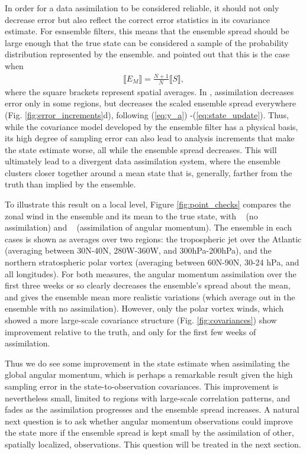 In order for a data assimilation to be considered reliable, it should not only 
decrease error but also reflect the correct error statistics in its covariance 
estimate. 
For esnsemble filters, this means that the ensemble spread should be large 
enough that the true state can be considered  a sample of the probability 
distribution represented by the ensemble.
 \citet{Huntley2009} and \citet{Murphy1988} pointed out that this is the case when 
 \begin{eqnarray}
	 \llbracket E_M \rrbracket = \frac{N+1}{N} \llbracket S \rrbracket, 
	 \label{eq:EvsS}
 \end{eqnarray}
where the square brackets represent spatial averages. 
In \ERPALL, assimilation decreases error only in some regions, but 
decreases the scaled ensemble spread everywhere (Fig. \ref{fig:error_increments}d), following (\ref{eq:y_a}) -(\ref{eq:state_update}).  
Thus, while the covariance model developed by the ensemble filter has a physical basis, its high degree of sampling error can also lead to analysis increments that make the state estimate worse, all while the ensemble spread decreases.  
This will ultimately lead to a divergent data assimilation system, where the ensemble clusters closer together around a mean state that is, generally, farther from the truth than implied by the ensemble. 


To illustrate this result on a local level, Figure \ref{fig:point_checks} compares the zonal wind in the ensemble and its mean to the true state, with \NODA~ (no assimilation) and \ERPALL~ (assimilation of angular momentum). 
The ensemble in each cases is shown as averages over two regions: the tropospheric jet over the Atlantic (averaging between 30N-40N, 280W-360W, and 300hPa-200hPa), and the northern stratospheric polar vortex (averaging between 60N-90N, 30-24 hPa, and all longitudes).
For both measures, the angular momentum assimilation over the first three weeks or so clearly decreases the ensemble's spread about the mean, and gives the ensemble mean more realistic variations (which average out in the ensemble with no assimilation). 
However, only the polar vortex winds, which showed a more large-scale covariance structure (Fig. \ref{fig:covariances}) show improvement relative to the truth, and only for the first few weeks of assimilation. 

Thus we do see some improvement in the state estimate when assimilating the global angular momentum, which is perhaps a remarkable result given the high sampling error in the state-to-observation covariances. 
This improvement is nevertheless small, limited to regions with large-scale correlation patterns, and fades as the assimilation progresses and the ensemble spread increases.
A natural next question is to ask whether angular momentum observations could improve the state more if the ensemble spread is kept small by the assimilation of other, spatially localized, observations. 
This question will be treated in the next section.  
